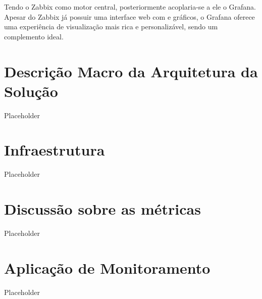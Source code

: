 {Tendo o Zabbix como motor central, posteriormente acoplaria-se a ele o Grafana. Apesar do Zabbix já possuir uma interface web com  e gráficos, o Grafana oferece uma experiência de visualização mais rica e personalizável, sendo um complemento ideal.



}
\section{Descrição Macro da Arquitetura da Solução}

Placeholder

\section{Infraestrutura}

Placeholder

\section{Discussão sobre as métricas}

Placeholder

\section{Aplicação de Monitoramento}

Placeholder
